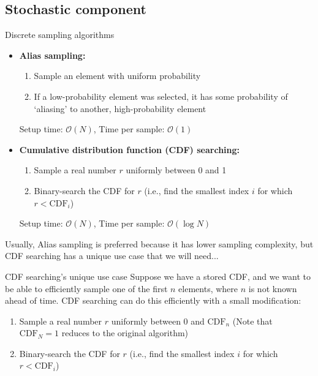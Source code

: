 \documentclass[amsmath]{beamer}
\begin{document}
\subsection{Stochastic component}
\begin{frame}{Discrete sampling algorithms}
	\begin{itemize}
		\item \textbf{Alias sampling:}
		\begin{enumerate}
			\item Sample an element with uniform probability
			\item If a low-probability element was selected, it has some probability of `aliasing' to another, high-probability element
		\end{enumerate}
	    Setup time: $\mathcal{O}(N)$, Time per sample: $\mathcal{O}(1)$
		\item \textbf{Cumulative distribution function (CDF) searching:}
		\begin{enumerate}
			\item Sample a real number $r$ uniformly between 0 and 1
			\item Binary-search the CDF for $r$ (i.e., find the smallest index $i$ for which $r<\textrm{CDF}_i$)
		\end{enumerate}	
		Setup time: $\mathcal{O}(N)$, Time per sample: $\mathcal{O}(\log N)$
	\end{itemize}
Usually, Alias sampling is preferred because it has lower sampling complexity, but CDF searching has a unique use case that we will need...
\end{frame}

\begin{frame}{CDF searching's unique use case}
	Suppose we have a stored CDF, and we want to be able to efficiently sample one of the first $n$ elements, where $n$ is not known ahead of time. CDF searching can do this efficiently with a small modification:
	\begin{enumerate}
		\item Sample a real number $r$ uniformly between 0 and $\textrm{CDF}_n$ (Note that $\textrm{CDF}_N=1$ reduces to the original algorithm)
		\item Binary-search the CDF for $r$ (i.e., find the smallest index $i$ for which $r<\textrm{CDF}_i$)
	\end{enumerate}
\end{frame}
\end{document}
